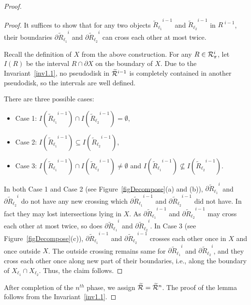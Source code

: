 \documentclass[a4paper,11pt]{article}
\begin{document}
\begin{proof}
\begin{figure}
\end{figure}

 \begin{proof}
It suffices to show that for any two objects ${{\widetilde{R}}_{\ell_1}}^{i-1}$ 
 and ${{\widetilde{R}}_{\ell_2}}^{i-1}$ in ${R~}^{i-1}$, their boundaries $\partial{{\widetilde{R}}_{\ell_1}}^{i}$ and  $\partial {{\widetilde{R}}_{\ell_2}}^{i}$ can cross each other at most twice. 
 
 Recall the definition of $X$ from the above construction.
For any 
$R\in {\cal R}_{\pi}^i$, let $I(R)$  be the interval $R\cap \partial X$ on 
the 
boundary of $X$. Due to the Invariant~\ref{inv1.1},  no pseudodisk in $\widetilde{\cal R}^{i-1}$ is completely 
contained in another pseudodisk, so the intervals are well defined.
 
 
 There are three possible cases: 

\begin{itemize}
 \item Case 1:  $I({{\widetilde{R}}_{\ell_1}}^{i-1})\cap 
I({{\widetilde{R}}_{\ell_2}}^{i-1})=\emptyset$,
\item Case 2:  $I({{\widetilde{R}}_{\ell_1}}^{i-1})\subseteq
I({{\widetilde{R}}_{\ell_2}}^{i-1})$,
\item Case 3:  $I({{\widetilde{R}}_{\ell_1}}^{i-1})\cap 
I({{\widetilde{R}}_{\ell_2}}^{i-1})\neq \emptyset$ and 
$I({{\widetilde{R}}_{\ell_1}}^{i-1})\nsubseteq
I({{\widetilde{R}}_{\ell_2}}^{i-1})$.
\end{itemize}
In both Case 1 and Case 2 (see Figure~\ref{figDecompose}(a) and (b)),  $\partial{{\widetilde{R}}_{\ell_1}}^{i}$ and  
$\partial{{\widetilde{R}}_{\ell_2}}^{i}$ do not have any new crossing which  
$\partial{{\widetilde{R}}_{\ell_1}}^{i-1}$ and  
$\partial{{\widetilde{R}}_{\ell_2}}^{i-1}$ did not have.
 In fact they may lost intersections lying in $X$. As 
$\partial {{\widetilde{R}}_{\ell_1}}^{i-1}$ 
 and $\partial {{\widetilde{R}}_{\ell_2}}^{i-1}$  may cross each other at most 
twice, so does $\partial{{\widetilde{R}}_{\ell_1}}^{i}$ and  
$\partial{{\widetilde{R}}_{\ell_2}}^{i}$.
In Case 3 (see Figure~\ref{figDecompose}(c)),   $\partial{{\widetilde{R}}_{\ell_1}}^{i-1}$ and  
$\partial{{\widetilde{R}}_{\ell_2}}^{i-1}$ crosses each other once in $X$ and once outside $X$. The outside crossing remains same for $\partial{{\widetilde{R}}_{\ell_1}}^{i}$ and  
$\partial{{\widetilde{R}}_{\ell_2}}^{i}$, and they cross each other once along  new part of  their boundaries, i.e.,  along the boundary of $X_{\ell_1}\cap X_{\ell_2}$. Thus, the claim follows.

\end{proof} 

 After completion 
of the $n^{th}$ phase, we 
assign $\widetilde{\cal R}=\widetilde{\cal R}^n$.
The proof of the lemma follows from the  Invariant~\ref{inv1.1}.
\end{proof}
\end{document}
